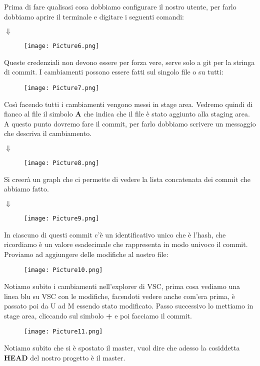 \documentclass[a4paper,12pt]{article}
\begin{document}
Prima di fare qualisasi cosa dobbiamo configurare il nostro utente, per farlo dobbiamo aprire il terminale e digitare i seguenti comandi:
\begin{center}
    $\Downarrow $
\end{center}
\begin{figure}[H]
  \centering
  \texttt{[image: Picture6.png]}
  \label{etichetta6}
\end{figure}
Queste credenziali non devono essere per forza vere, serve solo a git per la stringa di commit.
I cambiamenti possono essere fatti sul singolo file o su tutti:
\begin{figure}[H]
  \centering
  \texttt{[image: Picture7.png]}
  \label{etichetta7}
\end{figure}
\noindent Così facendo tutti i cambiamenti vengono messi in stage area.
Vedremo quindi di fianco al file il simbolo \textbf{A} che indica che il file è stato aggiunto alla staging area.
A questo punto dovremo fare il commit, per farlo dobbiamo scrivere un messaggio che descriva il cambiamento.
\begin{center}
    $\Downarrow$
\end{center}
\begin{figure}[H]
  \centering
  \texttt{[image: Picture8.png]}
  \label{etichetta8}
\end{figure}
Si creerà un graph che ci permette di vedere la lista concatenata dei commit che abbiamo fatto.
\begin{center}
    $\Downarrow$
\end{center}
\begin{figure}[H]
  \centering
  \texttt{[image: Picture9.png]}
  \label{etichetta9}
\end{figure}
In ciascuno di questi commit c'è un identificativo unico che è l'hash, che ricordiamo è un valore esadecimale che rappresenta in modo univoco il commit.
Proviamo ad aggiungere delle modifiche al nostro file:
\begin{figure}[H]
  \centering
  \texttt{[image: Picture10.png]}
  \label{etichetta10}
\end{figure}
\noindent Notiamo subito i cambiamenti nell'explorer di VSC, prima cosa vediamo una linea blu su VSC con le modifiche, facendoti vedere anche com'era prima, è passato poi da U ad M essendo stato modificato.
Passo successivo lo mettiamo in stage area, cliccando sul simbolo \textbf{+} e poi facciamo il commit.
\begin{figure}[H]
  \centering
  \texttt{[image: Picture11.png]}
  \label{etichetta11}
\end{figure}
\noindent Notiamo subito che si è spostato il master, vuol dire che adesso la cosiddetta \textbf{HEAD} del nostro progetto è il master.
\end{document}
